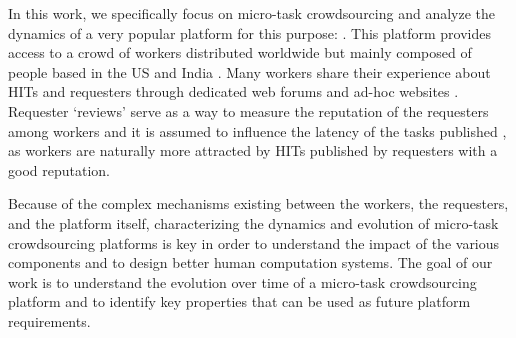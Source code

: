 In this work, we specifically focus on micro-task crowdsourcing and analyze the dynamics of a  very popular  platform for this purpose: \amt{}. This platform provides access to a crowd of workers distributed worldwide but mainly composed of people based in the US and India \cite{mturk}. Many \amt{} workers share their experience about HITs and requesters through dedicated web forums and ad-hoc websites \cite{turkopticon}. Requester `reviews' serve as a way to measure the reputation of the requesters among workers and it is assumed to influence the latency of the tasks published \cite{TOreputation}, as workers are naturally more attracted by HITs published by  requesters with a good reputation.





Because of the complex mechanisms existing between the workers, the requesters, and the platform itself, characterizing the dynamics and evolution of micro-task crowdsourcing platforms is key in order to understand the impact of the various components and to design better human computation systems. The goal of our work is to understand the evolution over time of a micro-task crowdsourcing platform and to identify key properties that can be used as future platform requirements.

